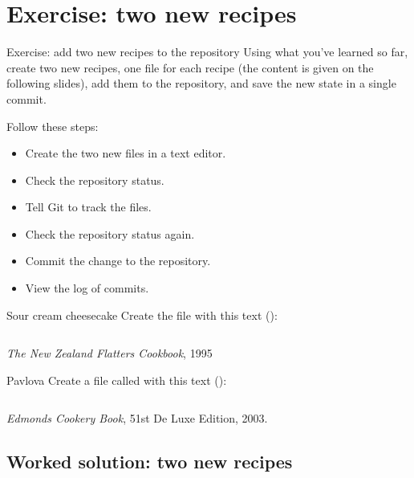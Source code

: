 \documentclass{git_course}
\begin{document}
\section{Exercise: two new recipes}

\begin{frame}[fragile]{Exercise: add two new recipes to the repository}
    Using what you've learned so far, create two new recipes, one file for
    each recipe (the content is given on the following slides), add them to
    the repository, and save the new state in a single commit.

    Follow these steps:
    \begin{itemize}
        \item Create the two new files in a text editor.
        \item Check the repository status.
        \item Tell Git to track the files.
        \item Check the repository status again.
        \item Commit the change to the repository.
        \item View the log of commits.
    \end{itemize}
\end{frame}

\begin{frame}{Sour cream cheesecake}
    Create the file  with this text
    (\href{https://raw.githubusercontent.com/paultcochrane/git_course/refs/heads/master/git/examples/flatters-sour-cream-cheesecake.md}{}):
    \inputminted[fontsize={\fontsize{5}{6}\selectfont}]{markdown}{examples/flatters-sour-cream-cheesecake.md}
    {\footnotesize \emph{The New Zealand Flatters Cookbook}, 1995}
\end{frame}

\begin{frame}{Pavlova}
    Create a file called  with this text
    (\href{https://raw.githubusercontent.com/paultcochrane/git_course/refs/heads/master/git/examples/edmonds-pavlova.md}{}):
    \inputminted[fontsize=\tiny]{markdown}{examples/edmonds-pavlova.md}
    {\footnotesize \emph{Edmonds Cookery Book}, 51st De Luxe Edition, 2003.}
\end{frame}

\subsection{Worked solution: two new recipes}
\end{document}
